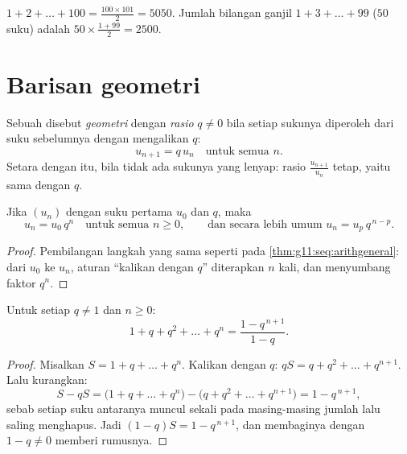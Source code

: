 \begin{example}
$1 + 2 + \dots + 100 = \frac{100 \times 101}{2} = 5050$. Jumlah
bilangan ganjil $1 + 3 + \dots + 99$ ($50$ suku) adalah
$50 \times \frac{1 + 99}{2} = 2500$.
\end{example}

\section{Barisan geometri}

\begin{definition}\label{def:g11:seq:geometric}
Sebuah  disebut \emph{geometri} dengan
\emph{rasio} $q \neq 0$ bila setiap sukunya diperoleh dari suku
sebelumnya dengan mengalikan $q$:
\[
u_{n+1} = q\,u_n \quad \text{untuk semua } n.
\]
Setara dengan itu, bila tidak ada sukunya yang lenyap: rasio
$\frac{u_{n+1}}{u_n}$ tetap, yaitu sama dengan $q$.
\end{definition}

\begin{theorem}\label{thm:g11:seq:geomgeneral}
Jika $(u_n)$  dengan suku pertama $u_0$ dan  $q$, maka
\[
u_n = u_0\, q^n \quad \text{untuk semua } n \geq 0,
\qquad\text{dan secara lebih umum } u_n = u_p\, q^{\,n-p} .
\]
\end{theorem}

\begin{proof}
Pembilangan langkah yang sama seperti pada \cref{thm:g11:seq:arithgeneral}:
dari $u_0$ ke $u_n$, aturan ``kalikan dengan $q$'' diterapkan $n$ kali, dan
menyumbang faktor $q^n$.
\end{proof}

\begin{theorem}\label{thm:g11:seq:geomsum}
Untuk setiap  $q \neq 1$ dan  $n \geq 0$:
\[
1 + q + q^2 + \dots + q^n = \frac{1 - q^{\,n+1}}{1 - q}.
\]
\end{theorem}

\begin{proof}
Misalkan $S = 1 + q + \dots + q^n$. Kalikan dengan $q$:
$qS = q + q^2 + \dots + q^{n+1}$. Lalu kurangkan:
\[
S - qS = \bigl(1 + q + \dots + q^n\bigr)
- \bigl(q + q^2 + \dots + q^{n+1}\bigr) = 1 - q^{\,n+1},
\]
sebab setiap suku antaranya muncul sekali pada masing-masing jumlah lalu
saling menghapus. Jadi $(1 - q)S = 1 - q^{\,n+1}$, dan membaginya dengan
$1 - q \neq 0$ memberi rumusnya.
\end{proof}


